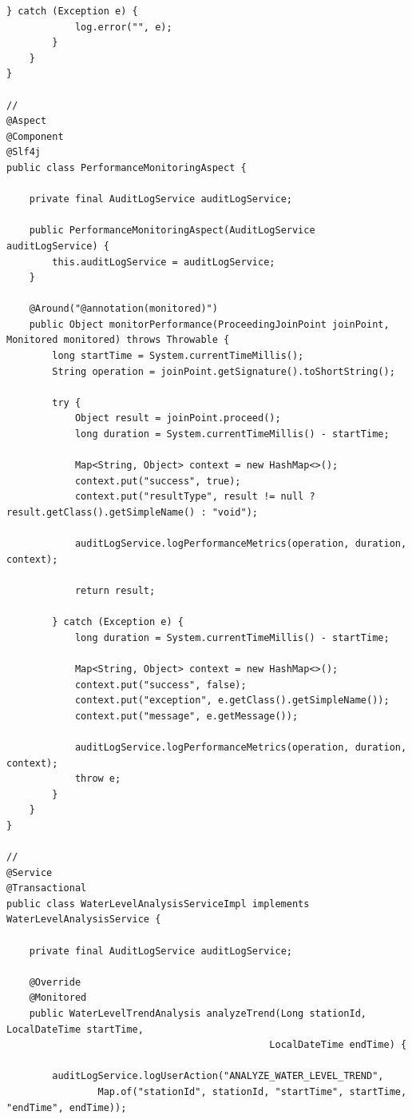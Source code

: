 \begin{lstlisting}[style=java]
        } catch (Exception e) {
            log.error("", e);
        }
    }
}

// 
@Aspect
@Component
@Slf4j
public class PerformanceMonitoringAspect {
    
    private final AuditLogService auditLogService;
    
    public PerformanceMonitoringAspect(AuditLogService auditLogService) {
        this.auditLogService = auditLogService;
    }
    
    @Around("@annotation(monitored)")
    public Object monitorPerformance(ProceedingJoinPoint joinPoint, Monitored monitored) throws Throwable {
        long startTime = System.currentTimeMillis();
        String operation = joinPoint.getSignature().toShortString();
        
        try {
            Object result = joinPoint.proceed();
            long duration = System.currentTimeMillis() - startTime;
            
            Map<String, Object> context = new HashMap<>();
            context.put("success", true);
            context.put("resultType", result != null ? result.getClass().getSimpleName() : "void");
            
            auditLogService.logPerformanceMetrics(operation, duration, context);
            
            return result;
            
        } catch (Exception e) {
            long duration = System.currentTimeMillis() - startTime;
            
            Map<String, Object> context = new HashMap<>();
            context.put("success", false);
            context.put("exception", e.getClass().getSimpleName());
            context.put("message", e.getMessage());
            
            auditLogService.logPerformanceMetrics(operation, duration, context);
            throw e;
        }
    }
}

// 
@Service
@Transactional
public class WaterLevelAnalysisServiceImpl implements WaterLevelAnalysisService {
    
    private final AuditLogService auditLogService;
    
    @Override
    @Monitored
    public WaterLevelTrendAnalysis analyzeTrend(Long stationId, LocalDateTime startTime, 
                                              LocalDateTime endTime) {
        
        auditLogService.logUserAction("ANALYZE_WATER_LEVEL_TREND", 
                Map.of("stationId", stationId, "startTime", startTime, "endTime", endTime));
        

\end{lstlisting}

